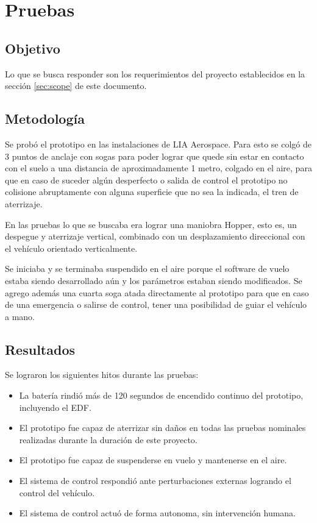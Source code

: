 \section{Pruebas}\label{sec:tests}

\subsection{Objetivo}
Lo que se busca responder son los requerimientos del proyecto establecidos en la sección \ref{sec:scope} de este documento.


\subsection{Metodología}
Se probó el prototipo en las instalaciones de LIA Aerospace. Para esto se colgó de 3 puntos de anclaje con sogas para poder lograr que quede sin estar en contacto con el suelo a una distancia de aproximadamente 1 metro, colgado en el aire, para que en caso de suceder algún desperfecto o salida de control el prototipo no colisione abruptamente con alguna superficie que no sea la indicada, el tren de aterrizaje.



\medskip

En las pruebas lo que se buscaba era lograr una maniobra Hopper, esto es, un despegue y aterrizaje vertical, combinado con un desplazamiento direccional con el vehículo orientado verticalmente.

\medskip

Se iniciaba y se terminaba suspendido en el aire porque el software de vuelo estaba siendo desarrollado aún y los parámetros estaban siendo modificados.
Se agrego además una cuarta soga atada directamente al prototipo para que en caso de una emergencia o salirse de control, tener una posibilidad de guiar el vehículo a mano.


\subsection{Resultados}

Se lograron los siguientes hitos durante las pruebas:
\begin{itemize}
    \item La batería rindió más de 120 segundos de encendido continuo del prototipo, incluyendo el EDF.
    \item El prototipo fue capaz de aterrizar sin daños en todas las pruebas nominales realizadas durante la duración de este proyecto.
    \item El prototipo fue capaz de suspenderse en vuelo y mantenerse en el aire.
    \item El sistema de control respondió ante perturbaciones externas logrando el control del vehículo.
    \item El sistema de control actuó de forma autonoma, sin intervención humana.
\end{itemize}

